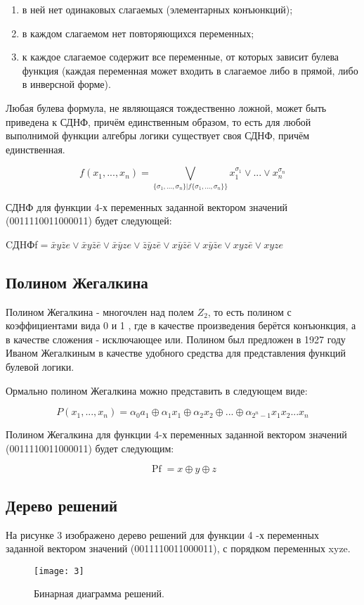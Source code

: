 \documentclass[10pt,a4paper,final]{article} %
\begin{document}
\begin{enumerate}[itemsep=0pt,parsep=0pt,topsep=0pt,partopsep=0pt]
	\item в ней нет одинаковых слагаемых (элементарных конъюнкций);
	
	\item в каждом слагаемом нет повторяющихся переменных;
	
	\item к каждое слагаемое содержит все переменные, от которых зависит булева функция (каждая переменная может входить в слагаемое либо в прямой, либо в инверсной форме).
	
\end{enumerate}

Любая булева формула, не являющаяся тождественно ложной, может быть приведена к СДНФ, причём единственным образом, то есть для любой выполнимой функции алгебры логики существует своя СДНФ, причём единственная.

$$f(x_1,...,x_n)=\bigvee_{\{\sigma_1,...,\sigma_n\}|f\{\sigma_1,...,\sigma_n\}\}} x_1^{\sigma_1} \lor ... \lor x_n^{\sigma_n}$$

СДНФ для функции 4-х переменных заданной вектором значений (0011110011000011) будет следующей:

CДHФf$ = 
\bar{x} y \bar{z} e \lor
\bar{x} y \bar{z} \bar{e} \lor
\bar{x}\bar{y}ze \lor 
\bar{z}\bar{y}z\bar{e} \lor
x\bar{y}\bar{z}\bar{e} \lor
x\bar{y}\bar{z}e \lor
xyz\bar{e} \lor
xyze$

\subsection{Полином Жегалкина}
Полином Жегалкина - многочлен над полем $Z_{2}$, то есть полином с коэффициентами вида 0 и 1 , где в качестве произведения берётся конъюнкция, а в качестве сложения - исключающее или. Полином был предложен в 1927 году Иваном Жегалкиным в качестве удобного средства для представления функций булевой логики.

Ормально полином Жегалкина можно представить в следующем виде:

$$ P(x_1,...,x_n)=\alpha_0a_1 \oplus \alpha_1 x_1 \oplus \alpha_2 x_2 \oplus ... \oplus \alpha_{2^n-1}x_1x_2...x_n$$


Полином Жегалкина для функции 4-х переменных заданной вектором значений (0011110011000011) будет следующим:

$$
\operatorname{Pf}= x \oplus y \oplus z 
$$


\subsection{Дерево решений}
На рисунке 3 изображено дерево решений для функции 4 -х переменных заданной вектором значений (0011110011000011), с порядком переменных xyze.
	\begin{figure}[h!]
	\centering
	\texttt{[image: 3]}
	\caption{Бинарная диаграмма решений.}
\end{figure}
\end{document}
